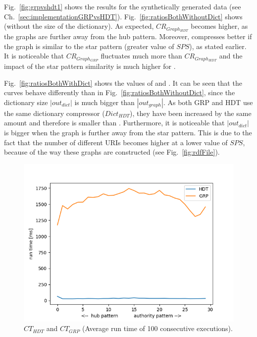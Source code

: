 Fig.~\ref{fig:grpvshdt1} shows the results for the synthetically generated data (see Ch.~\ref{sec:implementationGRPvsHDT}). Fig.~\ref{fig:ratiosBothWithoutDict} shows  (without the size of the dictionary). As expected, $CR_{Graph_{HDT}}$ becomes higher, as the graphs are further away from the hub pattern. Moreover, \GGRP{} compresses better if the graph is similar to the star pattern (greater value of $SPS$), as stated earlier. It is noticeable that $CR_{Graph_{GRP}}$ fluctuates much more than $CR_{Graph_{HDT}}$ and the impact of the star pattern similarity is much higher for \GGRP{}.


Fig.~\ref{fig:ratiosBothWithDict} shows the values of  and . It can be seen that the curves behave differently than in Fig.~\ref{fig:ratiosBothWithoutDict}, since the dictionary size $|out_{dict}|$ is much bigger than $|out_{graph}|$. As both GRP and HDT use the same dictionary compressor ($Dict_{HDT}$), they have been increased by the same amount and therefore  is smaller than . Furthermore, it is noticeable that $|out_{dict}|$ is bigger when the graph is further away from the star pattern. This is due to the fact that the number of different URIs becomes higher at a lower value of $SPS$, because of the way these graphs are constructed (see Fig.~\ref{fig:rdfFile}).

\begin{figure}
	\centering
	\includegraphics[width=0.7\linewidth]{figures/GRPvsHDT/runtimes}
	\caption{$CT_{HDT}$ and $CT_{GRP}$ (Average run time of 100 consecutive executions).}
	\label{fig:runtimes}
\end{figure}

